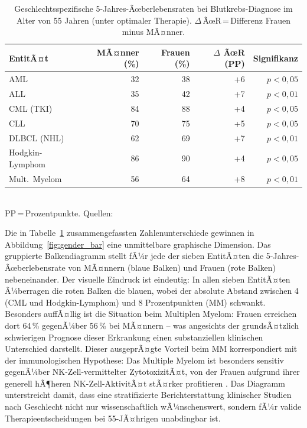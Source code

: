 ﻿\documentclass[12pt,a4paper]{article}
\theoremstyle{definition}
\begin{document}
\begin{table}[ht]
\centering
\caption{Geschlechtsspezifische 5-Jahres-Ãœberlebensraten bei Blutkrebs-Diagnose
im Alter von 55 Jahren (unter optimaler Therapie). $\Delta$\,ÃœR\,=\,Differenz
Frauen minus MÃ¤nner.}
\label{tab:gender_survival}
\begin{tabular}{@{}lrrrr@{}}
\toprule
EntitÃ¤t & MÃ¤nner (\%) & Frauen (\%) & $\Delta$ ÃœR (PP) & Signifikanz \\
\midrule
AML           & 32 & 38 & +6  & $p < 0{,}05$ \\
ALL           & 35 & 42 & +7  & $p < 0{,}01$ \\
CML (TKI)     & 84 & 88 & +4  & $p < 0{,}05$ \\
CLL           & 70 & 75 & +5  & $p < 0{,}05$ \\
DLBCL (NHL)   & 62 & 69 & +7  & $p < 0{,}01$ \\
Hodgkin-Lymphom   & 86 & 90 & +4  & $p < 0{,}05$ \\
Mult.\ Myelom & 56 & 64 & +8  & $p < 0{,}01$ \\
\bottomrule
\end{tabular}
\smallskip\\
\footnotesize PP\,=\,Prozentpunkte. Quellen: \cite{micheli2009,cook2009,frey2010,siegel2023,coiffier2002,kumar2017,hochhaus2017}
\end{table}

Die in Tabelle~\ref{tab:gender_survival} zusammengefassten Zahlenunterschiede gewinnen
in Abbildung~\ref{fig:gender_bar} eine unmittelbare graphische Dimension. Das gruppierte
Balkendiagramm stellt fÃ¼r jede der sieben EntitÃ¤ten die 5-Jahres-Ãœberlebensrate von
MÃ¤nnern (blaue Balken) und Frauen (rote Balken) nebeneinander. Der visuelle Eindruck
ist eindeutig: In allen sieben EntitÃ¤ten Ã¼berragen die roten Balken die blauen, wobei
der absolute Abstand zwischen 4 (CML und Hodgkin-Lymphom) und 8 Prozentpunkten (MM)
schwankt. Besonders auffÃ¤llig ist die Situation beim Multiplen Myelom: Frauen erreichen
dort 64\,\% gegenÃ¼ber 56\,\% bei MÃ¤nnern -- was angesichts der grundsÃ¤tzlich
schwierigen Prognose dieser Erkrankung einen substanziellen klinischen Unterschied
darstellt. Dieser ausgeprÃ¤gte Vorteil beim MM korrespondiert mit der immunologischen
Hypothese: Das Multiple Myelom ist besonders sensitiv gegenÃ¼ber NK-Zell-vermittelter
ZytotoxizitÃ¤t, von der Frauen aufgrund ihrer generell hÃ¶heren NK-Zell-AktivitÃ¤t stÃ¤rker
profitieren \cite{frey2010}. Das Diagramm unterstreicht damit, dass eine stratifizierte
Berichterstattung klinischer Studien nach Geschlecht nicht nur wissenschaftlich
wÃ¼nschenswert, sondern fÃ¼r valide Therapieentscheidungen bei 55-JÃ¤hrigen unabdingbar ist.
\end{document}
